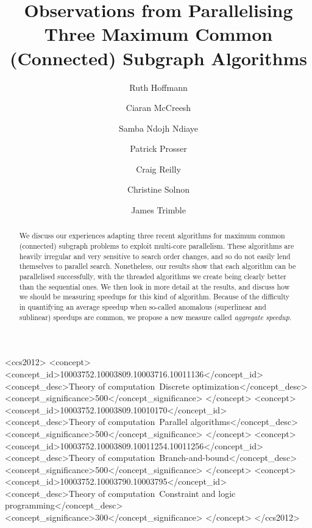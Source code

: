 \documentclass[sigconf]{acmart}
\begin{document}
\title[Observations from Parallelising Three Subgraph Algorithms]{Observations from Parallelising Three Maximum Common (Connected) Subgraph Algorithms}

\author{Ruth Hoffmann}

\author{Ciaran McCreesh}

\author{Samba Ndojh Ndiaye}

\author{Patrick Prosser}

\author{Craig Reilly}

\author{Christine Solnon}

\author{James Trimble}

\renewcommand{\shortauthors}{R. Hoffmann, C. McCreesh et al.}

\begin{abstract}
    We discuss our experiences adapting three recent algorithms for maximum common (connected)
    subgraph problems to exploit multi-core parallelism. These algorithms are heavily irregular and
    very sensitive to search order changes, and so do not easily lend themselves to parallel search.
    Nonetheless, our results show that each algorithm can be parallelised successfully, with the
    threaded algorithms we create being clearly better than the sequential ones. We then look in
    more detail at the results, and discuss how we should be
    measuring speedups for this kind of algorithm. Because of the difficulty in quantifying an
    average speedup when so-called anomalous (superlinear and sublinear) speedups are common, we
    propose a new measure called \emph{aggregate speedup}.
\end{abstract}

\begin{CCSXML}
<ccs2012>
<concept>
<concept_id>10003752.10003809.10003716.10011136</concept_id>
<concept_desc>Theory of computation~Discrete optimization</concept_desc>
<concept_significance>500</concept_significance>
</concept>
<concept>
<concept_id>10003752.10003809.10010170</concept_id>
<concept_desc>Theory of computation~Parallel algorithms</concept_desc>
<concept_significance>500</concept_significance>
</concept>
<concept>
<concept_id>10003752.10003809.10011254.10011256</concept_id>
<concept_desc>Theory of computation~Branch-and-bound</concept_desc>
<concept_significance>500</concept_significance>
</concept>
<concept>
<concept_id>10003752.10003790.10003795</concept_id>
<concept_desc>Theory of computation~Constraint and logic programming</concept_desc>
<concept_significance>300</concept_significance>
</concept>
</ccs2012>
\end{CCSXML}
\end{document}
